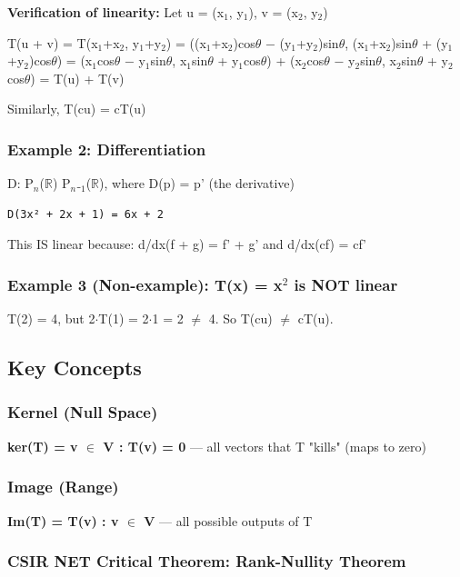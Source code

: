 \documentclass[12pt,a4paper,openany]{book}
\begin{document}
{{\textbf{Verification of linearity:}
Let u = (x$_1$, y$_1$), v = (x$_2$, y$_2$)

T(u + v) = T(x$_1$+x$_2$, y$_1$+y$_2$)
= ((x$_1$+x$_2$)cos$\theta$ − (y$_1$+y$_2$)sin$\theta$, (x$_1$+x$_2$)sin$\theta$ + (y$_1$+y$_2$)cos$\theta$)
= (x$_1$cos$\theta$ − y$_1$sin$\theta$, x$_1$sin$\theta$ + y$_1$cos$\theta$) + (x$_2$cos$\theta$ − y$_2$sin$\theta$, x$_2$sin$\theta$ + y$_2$cos$\theta$)
= T(u) + T(v) 

Similarly, T(cu) = cT(u) 

\subsubsection{Example 2: Differentiation}
D: P$_n$($\mathbb{R}$)  P$_n$₋$_1$($\mathbb{R}$), where D(p) = p' (the derivative)

\begin{verbatim}
D(3x² + 2x + 1) = 6x + 2
\end{verbatim}

This IS linear because: d/dx(f + g) = f' + g' and d/dx(cf) = cf'

\subsubsection{Example 3 (Non-example): T(x) = x$^2$ is NOT linear}
T(2) = 4, but 2$\cdot$T(1) = 2$\cdot$1 = 2 $\neq$ 4. So T(cu) $\neq$ cT(u). 

\subsection{Key Concepts}

\subsubsection{Kernel (Null Space)}
\textbf{ker(T) = {v $\in$ V : T(v) = 0}} — all vectors that T "kills" (maps to zero)

\subsubsection{Image (Range)}
\textbf{Im(T) = {T(v) : v $\in$ V}} — all possible outputs of T

\subsubsection{ CSIR NET Critical Theorem: Rank-Nullity Theorem}

}}
\end{document}
